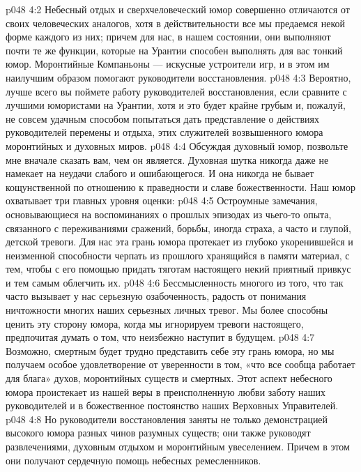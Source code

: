 \vs p048 4:2 Небесный отдых и сверхчеловеческий юмор совершенно отличаются от своих человеческих аналогов, хотя в действительности все мы предаемся некой форме каждого из них; причем для нас, в нашем состоянии, они выполняют почти те же функции, которые на Урантии способен выполнять для вас тонкий юмор. Моронтийные Компаньоны --- искусные устроители игр, и в этом им наилучшим образом помогают руководители восстановления.
\vs p048 4:3 Вероятно, лучше всего вы поймете работу руководителей восстановления, если сравните с лучшими юмористами на Урантии, хотя и это будет крайне грубым и, пожалуй, не совсем удачным способом попытаться дать представление о действиях руководителей перемены и отдыха, этих служителей возвышенного юмора моронтийных и духовных миров.
\vs p048 4:4 \pc Обсуждая духовный юмор, позвольте мне вначале сказать вам, чем он  является. Духовная шутка никогда даже не намекает на неудачи слабого и ошибающегося. И она никогда не бывает кощунственной по отношению к праведности и славе божественности. Наш юмор охватывает три главных уровня оценки:
\vs p048 4:5 \pc {}\bibnobreakspace {} Остроумные замечания, основывающиеся на воспоминаниях о прошлых эпизодах из чьего\hyp{}то опыта, связанного с переживаниями сражений, борьбы, иногда страха, а часто и глупой, детской тревоги. Для нас эта грань юмора протекает из глубоко укоренившейся и неизменной способности черпать из прошлого хранящийся в памяти материал, с тем, чтобы с его помощью придать тяготам настоящего некий приятный привкус и тем самым облегчить их.
\vs p048 4:6 \pc {}\bibnobreakspace {} Бессмысленность многого из того, что так часто вызывает у нас серьезную озабоченность, радость от понимания ничтожности многих наших серьезных личных тревог. Мы более способны ценить эту сторону юмора, когда мы игнорируем тревоги настоящего, предпочитая думать о том, что неизбежно наступит в будущем.
\vs p048 4:7 \pc {}\bibnobreakspace {} Возможно, смертным будет трудно представить себе эту грань юмора, но мы получаем особое удовлетворение от уверенности в том, «что все сообща работает для блага» духов, моронтийных существ и смертных. Этот аспект небесного юмора проистекает из нашей веры в преисполненную любви заботу наших руководителей и в божественное постоянство наших Верховных Управителей.
\vs p048 4:8 \pc Но руководители восстановления заняты не только демонстрацией высокого юмора разных чинов разумных существ; они также руководят развлечениями, духовным отдыхом и моронтийным увеселением. Причем в этом они получают сердечную помощь небесных ремесленников.
